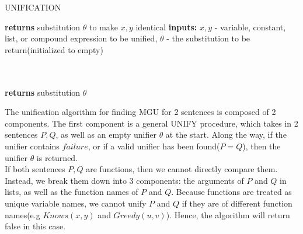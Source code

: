 \documentclass[12pt]{article}
\begin{document}
\begin{algorithm}[H]
\begin{algorithmic}
\caption{\textsc{\small{UNIFICATION}}}\label{euclid}
 \textbf{returns} substitution $\theta$ to make $x, y$ identical
\State \textbf{inputs:} 
\State $x, y$ - variable, constant, list, or compound expression to be unified, 
\State $\theta$ - the substitution to be return(initialized to empty)\\

 
 \Return{$\theta$}
 
 
\State {}
\State {}
\Else \ 
\EndIf

\EndProcedure\\

 \textbf{returns} substitution $\theta$
 
  
 
\Else \ 
\EndIf
\EndProcedure
\end{algorithmic}
\end{algorithm}

The unification algorithm for finding MGU for 2 sentences is composed of 2 components. The first component is a general \textsc{\small{UNIFY}} procedure, which takes in 2 sentences $P, Q$, as well as an empty unifier $\theta$ at the start. Along the way, if the unifier contains $failure$, or if a valid unifier has been found($P = Q$), then the unifier $\theta$ is returned.\\

If both sentences $P, Q$ are functions, then we cannot directly compare them. Instead, we break them down into 3 components: the arguments of $P$ and $Q$ in lists, as well as the function names of $P$ and $Q$. Because functions are treated as unique variable names, we cannot unify $P$ and $Q$ if they are of different function names(e.g $Knows(x, y)$ and $Greedy(u, v)$). Hence, the algorithm will return false in this case.\\
\end{document}

